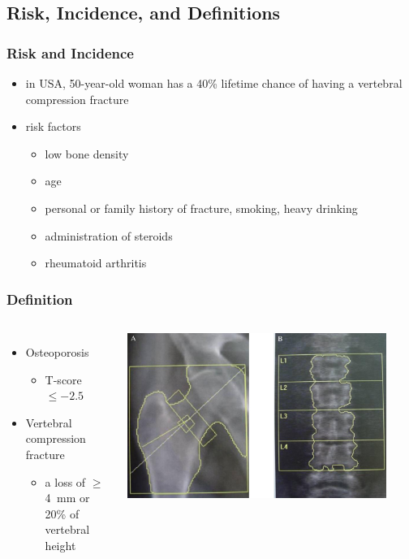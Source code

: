 \documentclass{beamer}
\begin{document}
\subsection{Risk, Incidence, and Definitions}
	\begin{frame}
		\frametitle{Risk and Incidence}
			\begin{itemize}
				\item in USA, 50-year-old woman has a 40\% lifetime chance of having a vertebral compression fracture 
				\item risk factors
					\begin{itemize}
						\item low bone density
						\item age
						\item personal or family history of fracture, smoking, heavy drinking
						\item administration of steroids
						\item rheumatoid arthritis
					\end{itemize}
			\end{itemize}
	\end{frame}
	\begin{frame}
		\frametitle{Definition}
		\begin{columns}
			\column{0.5\textwidth}
			\centering
				\begin{itemize}
					\item Osteoporosis
						\begin{itemize}
							\item T-score $\leq-2.5$
						\end{itemize}
					\item Vertebral compression fracture
						\begin{itemize}
							\item a loss of $\geq$4  mm or 20\% of vertebral height
						\end{itemize}
				\end{itemize}
			\column{0.5\textwidth}
			\centering
			\pause
			\includegraphics[width=0.9\textwidth,keepaspectratio]{media/dexa.jpg}
		\end{columns}
	\end{frame}
\end{document}
